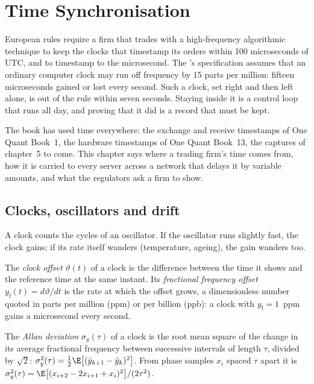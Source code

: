 \chapter{Time Synchronisation}\label{ch:nw:time-synchronisation}

European rules require a firm that trades with a high-frequency algorithmic technique to keep the clocks that timestamp its
orders within 100 microseconds of UTC, and to timestamp to the microsecond. The 's specification assumes that
an ordinary computer clock may run off frequency by 15 parts per million: fifteen microseconds gained or lost every second. Such a
clock, set right and then left alone, is out of the rule within seven seconds. Staying inside it is a control loop that runs all
day, and proving that it did is a record that must be kept.

The book has used time everywhere: the exchange and receive timestamps of One Quant Book~1, the hardware timestamps of One Quant
Book~13, the captures of chapter~5 to come. This chapter says where a trading firm's time comes from, how it is carried to every
server across a network that delays it by variable amounts, and what the regulators ask a firm to show.

\section{Clocks, oscillators and drift}

A clock counts the cycles of an oscillator. If the oscillator runs slightly fast, the clock gains; if its rate itself wanders
(temperature, ageing), the gain wanders too.

\begin{definition}\label{def:nw:time-synchronisation:offset}
The \emph{clock offset} $\vartheta(t)$ of a clock is the difference between the time it shows and the reference
time at the same instant. Its \emph{fractional frequency offset} $y_{\mathrm f}(t) =
d\vartheta/dt$ is the rate at which the offset grows, a dimensionless number quoted in parts per million (ppm) or per billion
(ppb): a clock with $y_{\mathrm f} = 1$~ppm gains a microsecond every second.
\end{definition}

\begin{definition}\label{def:nw:time-synchronisation:adev}
The \emph{Allan deviation} $\sigma_y(\tau)$ of a clock is the root mean square of the change in its average
fractional frequency between successive intervals of length $\tau$, divided by $\sqrt2$:
$\sigma_y^2(\tau) = \tfrac12 \E\bigl[(\bar y_{k+1} - \bar y_k)^2\bigr]$. From phase samples $x_i$ spaced $\tau$ apart it is
$\sigma_y^2(\tau) = \E\bigl[(x_{i+2} - 2x_{i+1} + x_i)^2\bigr] / (2\tau^2)$.
\end{definition}

